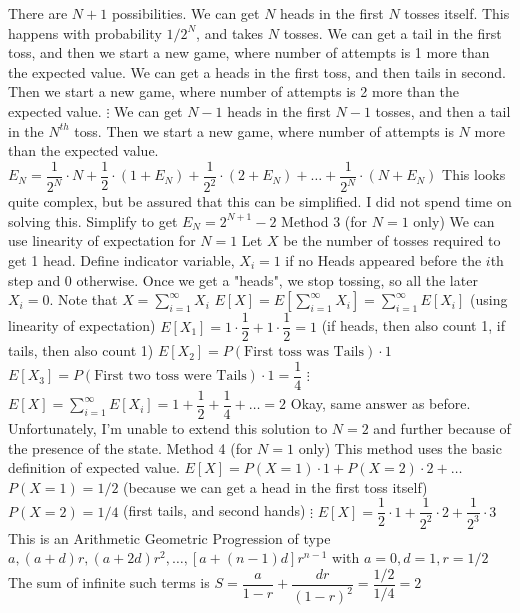 \begin{enumerate}
There are $N+1$ possibilities.
We can get $N$ heads in the first $N$ tosses itself. This happens with probability $1/2^N$, and takes $N$ tosses.
We can get a tail in the first toss, and then we start a new game, where number of attempts is 1 more than the expected value.
We can get a heads in the first toss, and then tails in second. Then we start a new game, where number of attempts is 2 more than the expected value.
$\vdots$
We can get $N-1$ heads in the first $N-1$ tosses, and then a tail in the $N^{th}$ toss. Then we start a new game, where number of attempts is $N$ more than the expected value.
$E_N = \dfrac{1}{2^N} \cdot N + \dfrac{1}{2} \cdot (1 + E_N) + \dfrac{1}{2^2} \cdot (2 + E_N) + \ldots + \dfrac{1}{2^{N}} \cdot (N + E_N)$
This looks quite complex, but be assured that this can be simplified. I did not spend time on solving this.
Simplify to get $E_N = 2^{N+1}-2$
Method 3 (for $N=1$ only)
We can use linearity of expectation for $N=1$
Let $X$ be the number of tosses required to get 1 head.
Define indicator variable, $X_i = 1$ if no Heads appeared before the $i$th step and $0$ otherwise. Once we get a "heads", we stop tossing, so all the later $X_i=0$.
Note that $X = \sum_{i=1}^{\infty} X_i$
$E[X] = E[\sum_{i=1}^{\infty} X_i] = \sum_{i=1}^{\infty} E[X_i]$ (using linearity of expectation)
$E[X_1] = 1 \cdot \dfrac{1}{2} + 1 \cdot \dfrac{1}{2} = 1$ (if heads, then also count 1, if tails, then also count 1)
$E[X_2] = P(\text{First toss was Tails}) \cdot  1$
$E[X_3] = P(\text{First two toss were Tails}) \cdot 1 = \dfrac{1}{4}$
$\vdots$
$E[X] = \sum_{i=1}^{\infty} E[X_i] = 1 + \dfrac{1}{2} + \dfrac{1}{4} + \ldots = 2$
Okay, same answer as before.
Unfortunately, I'm unable to extend this solution to $N=2$ and further because of the presence of the state.
Method 4 (for $N=1$ only)
This method uses the basic definition of expected value.
$E[X] = P(X=1) \cdot 1 + P(X=2) \cdot 2 + \ldots$
$P(X=1) = 1/2$ (because we can get a head in the first toss itself)
$P(X=2) = 1/4$ (first tails, and second hands)
$\vdots$
$E[X] = \dfrac{1}{2} \cdot 1 + \dfrac{1}{2^2} \cdot 2 + \dfrac{1}{2^3} \cdot{3}$
This is an Arithmetic Geometric Progression of type $a, (a+d)r, (a+2d)r^2, \ldots, [a + (n-1)d] r^{n-1}$ with $a=0, d=1, r=1/2$
The sum of infinite such terms is $S =  \dfrac{a}{1-r} + \dfrac{dr}{(1-r)^2} = \dfrac{1/2}{1/4} = 2$





\end{enumerate}
